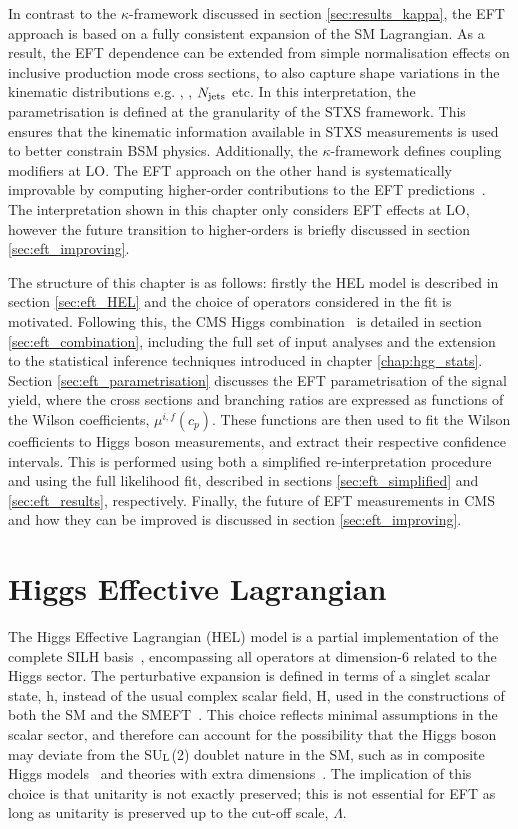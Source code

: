 In contrast to the $\kappa$-framework discussed in section \ref{sec:results_kappa}, the EFT approach is based on a fully consistent expansion of the SM Lagrangian. As a result, the EFT dependence can be extended from simple normalisation effects on inclusive production mode cross sections, to also capture shape variations in the kinematic distributions e.g. \ptH, \mjj, $N_{\rm{jets}}$ etc. In this interpretation, the parametrisation is defined at the granularity of the STXS framework. This ensures that the kinematic information available in STXS measurements is used to better constrain BSM physics. Additionally, the $\kappa$-framework defines coupling modifiers at LO. The EFT approach on the other hand is systematically improvable by computing higher-order contributions to the EFT predictions~\cite{Degrande:2020evl}. The interpretation shown in this chapter only considers EFT effects at LO, however the future transition to higher-orders is briefly discussed in section \ref{sec:eft_improving}.

The structure of this chapter is as follows: firstly the HEL model is described in section \ref{sec:eft_HEL} and the choice of operators considered in the fit is motivated. Following this, the CMS Higgs combination~\cite{CMS-PAS-HIG-19-005} is detailed in section \ref{sec:eft_combination}, including the full set of input analyses and the extension to the statistical inference techniques introduced in chapter \ref{chap:hgg_stats}. Section \ref{sec:eft_parametrisation} discusses the EFT parametrisation of the signal yield, where the cross sections and branching ratios are expressed as functions of the Wilson coefficients, $\mu^{i,f}(c_p)$. These functions are then used to fit the Wilson coefficients to Higgs boson measurements, and extract their respective confidence intervals. This is performed using both a simplified re-interpretation procedure and using the full likelihood fit, described in sections \ref{sec:eft_simplified} and \ref{sec:eft_results}, respectively. Finally, the future of EFT measurements in CMS and how they can be improved is discussed in section \ref{sec:eft_improving}.

\section{Higgs Effective Lagrangian}\label{sec:eft_hel}
The Higgs Effective Lagrangian (HEL) model is a partial implementation of the complete SILH basis~\cite{}, encompassing all operators at dimension-6 related to the Higgs sector. The perturbative expansion is defined in terms of a singlet scalar state, h, instead of the usual complex scalar field, H, used in the constructions of both the SM and the SMEFT~\cite{}. This choice reflects minimal assumptions in the scalar sector, and therefore can account for the possibility that the Higgs boson may deviate from the SU$_{\rm{L}}$(2) doublet nature in the SM, such as in composite Higgs models~\cite{} and theories with extra dimensions~\cite{}. The implication of this choice is that unitarity is not exactly preserved; this is not essential for EFT as long as unitarity is preserved up to the cut-off scale, $\Lambda$.

